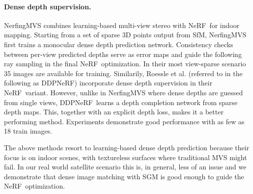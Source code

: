 \documentclass{isprs} %
\newcommand{\Nerf}{{NeRF}}
\begin{document}
\paragraph{Dense depth supervision.} NerfingMVS \cite{wei2021nerfingmvs} combines learning-based multi-view stereo with \Nerf~for indoor mapping. Starting from a set of sparse 3D points output from SfM, NerfingMVS first trains a monocular dense depth prediction network. Consistency checks between per-view predicted depths serve as error maps and guide the following ray sampling in the final \Nerf~optimization. In their most view-sparse scenario 35 images are available for training. 
Similarily, Roessle et al. \cite{roessle2022dense} (referred to in the following as DDP\Nerf) incorporate dense depth supervision in their \Nerf~variant. However, unlike in NerfingMVS where dense depths are guessed from single views, DDP\Nerf~learns a depth completion network from sparse depth maps. This, together with an explicit depth loss, makes it a better performing method. Experiments demonstrate good performance with as few as 18 train images.

The above methods resort to learning-based dense depth prediction because their focus is on indoor scenes, with textureless surfaces where traditional MVS might fail. In our real world satellite scenario this is, in general, less of an issue and we demonstrate that dense image matching with SGM is good enough to guide the \Nerf~optimization.
\end{document}
